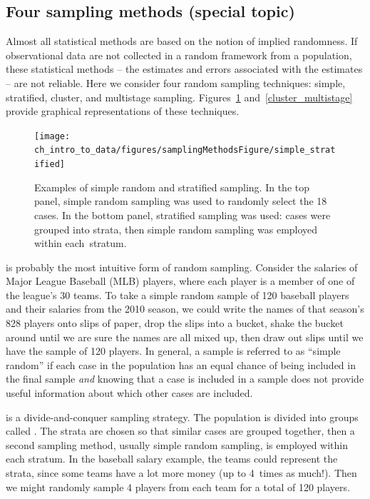 \subsection{Four sampling methods (special topic)}
\label{fourSamplingMethods}
\label{threeSamplingMethods}

Almost all statistical methods are based on the notion of implied randomness. If observational data are not collected in a random framework from a population, these statistical methods -- the estimates and errors associated with the estimates -- are not reliable. Here we consider four random sampling techniques: simple, stratified, cluster, and multistage sampling. Figures~\ref{simple_stratified} and~\ref{cluster_multistage} provide graphical representations of these techniques.

\begin{figure}
\centering
\texttt{[image: ch\_intro\_to\_data/figures/samplingMethodsFigure/simple\_stratified]}
\caption{Examples of simple random and stratified sampling. In the top panel, simple random sampling was used to randomly select the 18 cases. In the bottom panel, stratified sampling was used: cases were grouped into strata, then simple random sampling was employed within \mbox{each stratum}.}
\label{simple_stratified}
\end{figure}

 is probably the most intuitive form of random sampling. Consider the salaries of Major League Baseball (MLB) players, where each player is a member of one of the league's 30 teams. To take a simple random sample of 120 baseball players and their salaries from the 2010 season, we could write the names of that season's 828 players onto slips of paper, drop the slips into a bucket, shake the bucket around until we are sure the names are all mixed up, then draw out slips until we have the sample of 120 players. In general, a sample is referred to as ``simple random'' if each case in the population has an equal chance of being included in the final sample \emph{and} knowing that a case is included in a sample does not provide useful information about which other cases are included.

 is a divide-and-conquer sampling strategy. The population is divided into groups called . The strata are chosen so that similar cases are grouped together, then a second sampling method, usually simple random sampling, is employed within each stratum. In the baseball salary example, the teams could represent the strata, since some teams have a lot more money (up to 4~times as much!). Then we might randomly sample 4 players from each team for a total of 120 players.

